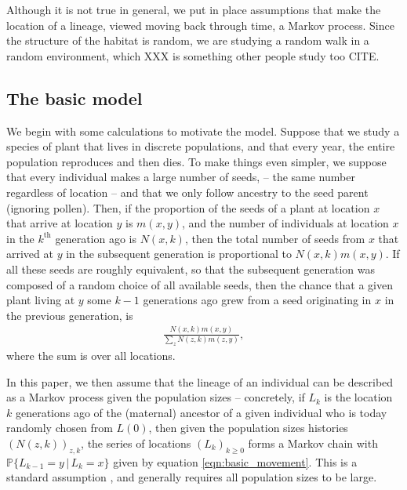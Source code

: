 \documentclass{article}
\renewcommand{\P}{\mathbb{P}}
\newcommand{\given}{\,\vert\,}
\begin{document}
Although it is not true in general,
we put in place assumptions that make the location of a lineage,
viewed moving back through time, a Markov process.
Since the structure of the habitat is random,
we are studying a random walk in a random environment,
which XXX is something other people study too CITE.


\subsection*{The basic model}

We begin with some calculations to motivate the model.
Suppose that we study a species of plant that lives in discrete populations,
and that every year, the entire population reproduces and then dies.
To make things even simpler, we suppose that every individual makes a large number of seeds,
-- the same number regardless of location --
and that we only follow ancestry to the seed parent (ignoring pollen).
Then, if the proportion of the seeds of a plant at location $x$
that arrive at location $y$ is $m(x,y)$,
and the number of individuals at location $x$ in the $k^\text{th}$ generation ago is $N(x,k)$,
then the total number of seeds from $x$ that arrived at $y$ in the subsequent generation
is proportional to $N(x,k) m(x,y)$.
If all these seeds are roughly equivalent, so that the subsequent generation was composed of a random choice
of all available seeds, then the chance that a given plant living at $y$ some $k-1$ generations ago
grew from a seed originating in $x$ in the previous generation, is
\begin{align} \label{eqn:basic_movement}
    \frac{N(x,k) m(x,y)}{\sum_z N(z,k) m(z,y)},
\end{align}
where the sum is over all locations.

In this paper,
we then assume that the lineage of an individual can be described as a Markov process given the population sizes --
concretely, if $L_k$ is the location $k$ generations ago 
of the (maternal) ancestor of a given individual who is today randomly chosen from $L(0)$,
then given the population sizes histories $(N(z,k))_{z,k}$,
the series of locations $(L_k)_{k \ge 0}$ forms a Markov chain with 
$\P\{L_{k-1} = y \given L_k = x\}$ given by equation \eqref{eqn:basic_movement}.
This is a standard assumption \citep{wakeley2009coalescent},
and generally requires all population sizes to be large.
\end{document}
